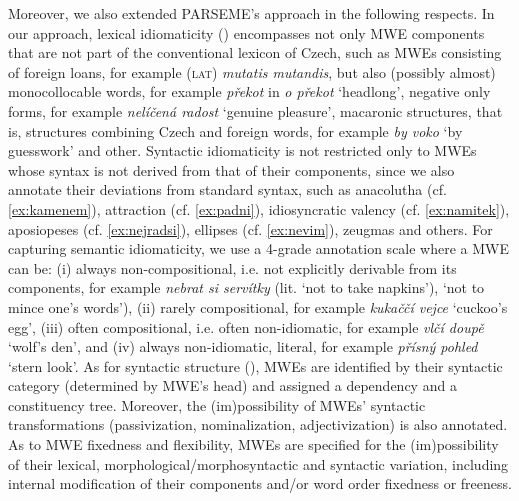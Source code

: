 \documentclass[output=paper,colorlinks,citecolor=brown]{langscibook}
\begin{document}
\noindent
Moreover, we also extended PARSEME's approach in the following respects. In our approach, lexical idiomaticity () encompasses not only MWE components that are not part of the conventional lexicon of Czech, such as MWEs consisting of foreign loans, for example (\textsc{lat}) \emph{mutatis mutandis}, but also (possibly almost) monocollocable words, for example \emph{překot} in \emph{o překot} ‘headlong’, negative only forms, for example \emph{nelíčená radost} ‘genuine pleasure’, macaronic structures, that is, structures combining Czech and foreign words, for example \emph{by voko} ‘by guesswork’ and other. Syntactic idiomaticity is not restricted only to MWEs whose syntax is not derived from that of their components, since we also annotate their deviations from standard syntax, such as anacolutha (cf. \ref{ex:kamenem}), attraction (cf. \ref{ex:padni}), idiosyncratic valency (cf. \ref{ex:namitek}), aposiopeses (cf. \ref{ex:nejradsi}), ellipses (cf. \ref{ex:nevim}), zeugmas and others. For capturing semantic idiomaticity, we use a 4-grade annotation scale where a MWE can be: (i) always non-compositional, i.e. not explicitly derivable from its components, for example \emph{nebrat si servítky} (lit. `not to take napkins'), ‘not to mince one's words’), (ii) rarely compositional, for example \emph{kukaččí vejce} ‘cuckoo's egg’, (iii) often compositional, i.e. often non-idiomatic, for example \emph{vlčí doupě} ‘wolf's den’, and (iv) always non-idiomatic, literal, for example \emph{přísný pohled} ‘stern look’. 
 As for syntactic structure (), MWEs are identified by their syntactic category (determined by MWE's head) and assigned a dependency and a constituency tree. Moreover, the (im)possibility of MWEs' syntactic transformations (passivization, nominalization, adjectivization) is also annotated.
As to MWE fixedness and flexibility, MWEs are specified for the (im)possibility of their lexical, morphological/morphosyntactic and syntactic variation, including internal modification of their components and/or word order fixedness or freeness. 
\end{document}
